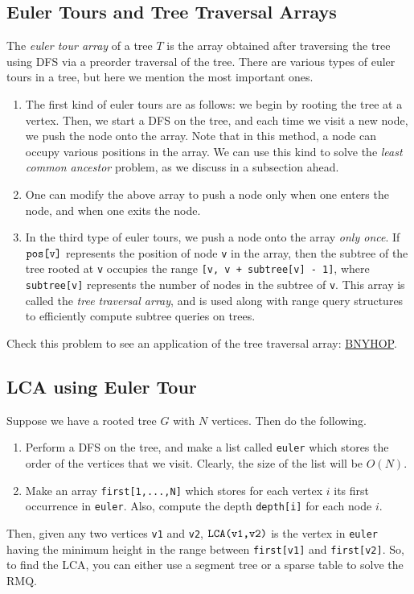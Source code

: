 \documentclass[12pt,a4paper]{amsart}
\numberwithin{equation}{section}
\theoremstyle{definition}
\begin{document}
\subsection{Euler Tours and Tree Traversal Arrays} The \textit{euler tour array} of a tree $T$ is the array obtained after traversing the tree using DFS via a preorder traversal of the tree. There are various types of euler tours in a tree, but here we mention the most important ones.
\begin{enumerate}
    \item The first kind of euler tours are as follows: we begin by rooting the tree at a vertex. Then, we start a DFS on the tree, and each time we visit a new node, we push the node onto the array. Note that in this method, a node can occupy various positions in the array. We can use this kind to solve the \textit{least common ancestor} problem, as we discuss in a subsection ahead. 
    \item One can modify the above array to push a node only when one enters the node, and when one exits the node. 
    \item In the third type of euler tours, we push a node onto the array \textit{only once}. If $\verb|pos[v]|$ represents the position of node \verb|v| in the array, then the subtree of the tree rooted at \verb|v| occupies the range \verb|[v, v + subtree[v] - 1]|, where \verb|subtree[v]| represents the number of nodes in the subtree of \verb|v|. This array is called the \textit{tree traversal array}, and is used along with range query structures to efficiently compute subtree queries on trees.
\end{enumerate}
Check this problem to see an application of the tree traversal array: \href{https://www.codechef.com/LTIME99B/problems/BNYHOP}{BNYHOP}.

\subsection{LCA using Euler Tour} Suppose we have a rooted tree $G$ with $N$ vertices. Then do the following. 
\begin{enumerate}
    \item Perform a DFS on the tree, and make a list called \verb|euler| which stores the order of the vertices that we visit. Clearly, the size of the list will be $O(N)$.
    \item Make an array \verb|first[1,...,N]| which stores for each vertex $i$ its first occurrence in \verb|euler|. Also, compute the depth \verb|depth[i]| for each node $i$. 
\end{enumerate}
Then, given any two vertices \verb|v1| and \verb|v2|, $\verb|LCA(v1,v2)|$ is the vertex in \verb|euler| having the minimum height in the range between \verb|first[v1]| and \verb|first[v2]|. So, to find the LCA, you can either use a segment tree or a sparse table to solve the RMQ. 
\end{document}
